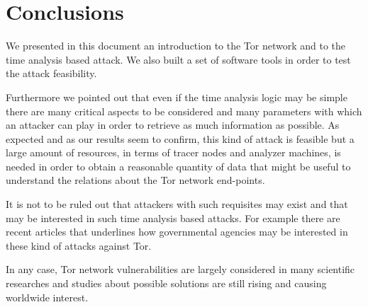 \section{Conclusions}
We presented in this document an introduction to the Tor network and to
the time analysis based attack. We also built a set of software tools in order
to test the attack feasibility. 

Furthermore we pointed out that even if the time analysis logic may be simple there are many critical
aspects to be considered and many parameters with which an attacker can
play in order to retrieve as much information as possible. As expected
and as our
results seem to confirm, this kind of attack is feasible but a large
amount of resources, in terms of tracer nodes and analyzer machines, 
is needed in order to obtain a reasonable quantity of data that might be useful to
understand the relations about the Tor network end-points. 

It is not to
be ruled out that attackers with such requisites may exist and that may be
interested in such time analysis based attacks. For example there are recent
articles\cite{vantor}\cite{schneier2013attacking} that underlines how
governmental agencies may be interested in
these kind of attacks against Tor.  


In any case, Tor network vulnerabilities are largely considered in many
scientific researches and studies about possible solutions are still
rising and causing worldwide interest.

